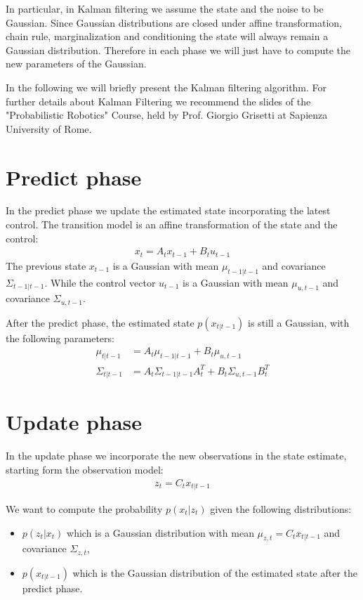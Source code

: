 In particular, in Kalman filtering we assume the state and the noise to be Gaussian. Since Gaussian distributions are closed under affine transformation, chain rule, marginalization and conditioning the state will always remain a Gaussian distribution. Therefore in each phase we will just have to compute the new parameters of the Gaussian.

In the following we will briefly present the Kalman filtering algorithm. For further details about Kalman Filtering we recommend the slides of the "Probabilistic Robotics" Course, held by Prof. Giorgio Grisetti at Sapienza University of Rome\supercite{prob_rob}.

\section{Predict phase}
In the predict phase we update the estimated state incorporating the latest control. The transition model is an affine transformation of the state and the control:
\begin{align}
	x_t = A_t x_{t-1} + B_t u_{t-1}\label{pred_model}
\end{align}
The previous state $x_{t-1}$ is a Gaussian with mean $\mu_{t-1|t-1}$ and covariance $\Sigma_{t-1|t-1}$.
While the control vector $u_{t-1}$ is a Gaussian with mean $\mu_{u,t-1}$ and covariance $\Sigma_{u,t-1}$.

After the predict phase, the estimated state $p(x_{t|t-1})$ is still a Gaussian, with the following parameters:
\begin{align}
	\mu_{t|t-1} &= A_t \mu_{t-1|t-1} + B_t \mu_{u,t-1}\label{pred_mean}\\
	\Sigma_{t|t-1} &= A_t \Sigma_{t-1|t-1} A_t^T + B_t \Sigma_{u,t-1} B_t^T\label{pred_cov}
\end{align}

\section{Update phase}
In the update phase we incorporate the new observations in the state estimate, starting form the observation model:
\begin{align}
	z_t = C_t x_{t|t-1}\label{upd_model}
\end{align}

We want to compute the probability $p(x_t|z_t)$ given the following distributions:
\begin{itemize}
	\item $p(z_t|x_t)$ which is a Gaussian distribution with mean $\mu_{z,t} = C_t x_{t|t-1}$ and covariance $\Sigma_{z,t}$,
	\item $p(x_{t|t-1})$ which is the Gaussian distribution of the estimated state after the predict phase.
\end{itemize}

